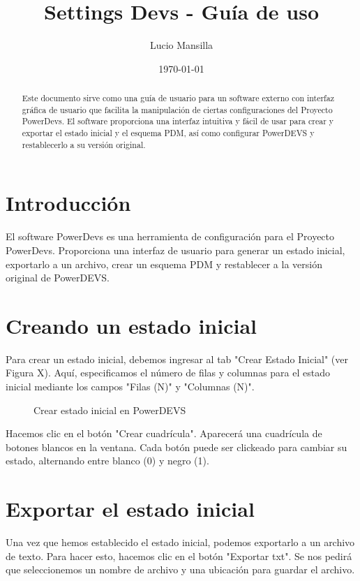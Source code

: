 \documentclass[]{article}
\title{\textbf{Settings Devs - Guía de uso}}
\author{Lucio Mansilla}
\date{\today}
\begin{document}
\maketitle
\begin{abstract}
    Este documento sirve como una guía de usuario para un software externo con interfaz gráfica de usuario que facilita la manipulación de ciertas configuraciones del Proyecto PowerDevs. El software proporciona una interfaz intuitiva y fácil de usar para crear y exportar el estado inicial y el esquema PDM, así como configurar PowerDEVS y restablecerlo a su versión original.
    \end{abstract}
    
    \section{Introducción}
    El software PowerDevs es una herramienta de configuración para el Proyecto PowerDevs. Proporciona una interfaz de usuario para generar un estado inicial, exportarlo a un archivo, crear un esquema PDM y restablecer a la versión original de PowerDEVS.
    
    \section{Creando un estado inicial}
    
    Para crear un estado inicial, debemos ingresar al tab "Crear Estado Inicial" (ver Figura X). Aquí, especificamos el número de filas y columnas para el estado inicial mediante los campos "Filas (N)" y "Columnas (N)".
    
    \begin{figure}[H]
    \centering
    \caption{Crear estado inicial en PowerDEVS}
    \label{fig:crear_estado_inicial}
    \end{figure}
    
    Hacemos clic en el botón "Crear cuadrícula". Aparecerá una cuadrícula de botones blancos en la ventana. Cada botón puede ser clickeado para cambiar su estado, alternando entre blanco (0) y negro (1).
    
    \section{Exportar el estado inicial}
    
    Una vez que hemos establecido el estado inicial, podemos exportarlo a un archivo de texto. Para hacer esto, hacemos clic en el botón "Exportar txt". Se nos pedirá que seleccionemos un nombre de archivo y una ubicación para guardar el archivo.
    
\end{document}
